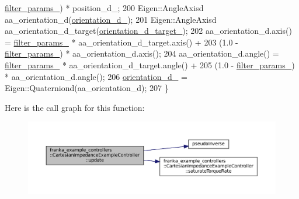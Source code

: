 \begin{DoxyCode}
      \hyperlink{classfranka__example__controllers_1_1CartesianImpedanceExampleController_a3684e222192042e190309d945c0f9589}{filter\_params\_}) * position\_d\_;
200   Eigen::AngleAxisd aa\_orientation\_d(\hyperlink{classfranka__example__controllers_1_1CartesianImpedanceExampleController_a8528ed0cf7de6439e65bb1d4c4017137}{orientation\_d\_});
201   Eigen::AngleAxisd aa\_orientation\_d\_target(\hyperlink{classfranka__example__controllers_1_1CartesianImpedanceExampleController_ae2c7eed26db0a1b708b91148451bb13e}{orientation\_d\_target\_});
202   aa\_orientation\_d.axis() = \hyperlink{classfranka__example__controllers_1_1CartesianImpedanceExampleController_a3684e222192042e190309d945c0f9589}{filter\_params\_} * aa\_orientation\_d\_target.axis() +
203                             (1.0 - \hyperlink{classfranka__example__controllers_1_1CartesianImpedanceExampleController_a3684e222192042e190309d945c0f9589}{filter\_params\_}) * aa\_orientation\_d.axis();
204   aa\_orientation\_d.angle() = \hyperlink{classfranka__example__controllers_1_1CartesianImpedanceExampleController_a3684e222192042e190309d945c0f9589}{filter\_params\_} * aa\_orientation\_d\_target.angle() +
205                              (1.0 - \hyperlink{classfranka__example__controllers_1_1CartesianImpedanceExampleController_a3684e222192042e190309d945c0f9589}{filter\_params\_}) * aa\_orientation\_d.angle();
206   \hyperlink{classfranka__example__controllers_1_1CartesianImpedanceExampleController_a8528ed0cf7de6439e65bb1d4c4017137}{orientation\_d\_} = Eigen::Quaterniond(aa\_orientation\_d);
207 \}
\end{DoxyCode}
Here is the call graph for this function\+:
\nopagebreak
\begin{figure}[H]
\begin{center}
\leavevmode
\includegraphics[width=350pt]{classfranka__example__controllers_1_1CartesianImpedanceExampleController_ab7e3690c65dbf1ff57a5d37cb651cd04_cgraph}
\end{center}
\end{figure}


